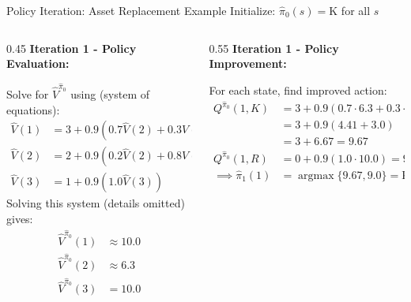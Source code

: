 \documentclass[10pt]{beamer}
\DeclareMathOperator*{\argmax}{argmax} %
\begin{document}
\begin{frame}{Policy Iteration: Asset Replacement Example}
    Initialize: $\hat{\pi}_0(s) = \text{K}$ for all $s$

    \begin{columns}[T] %
        \begin{column}{0.45\textwidth}
            \textbf{Iteration 1 - Policy Evaluation:}

            Solve for $\hat{V}^{\hat{\pi}_0}$ using (system of equations): \scriptsize %
            \begin{align*}
                \hat{V}(1) &= 3 + 0.9 (0.7 \hat{V}(2) + 0.3 \hat{V}(3)) \\
                \hat{V}(2) &= 2 + 0.9 (0.2 \hat{V}(2) + 0.8 \hat{V}(3)) \\
                \hat{V}(3) &= 1 + 0.9 (1.0 \hat{V}(3))
            \end{align*}
             Solving this system (details omitted) gives:
            \begin{align*}
                \hat{V}^{\hat{\pi}_0}(1) &\approx 10.0 \\ %
                \hat{V}^{\hat{\pi}_0}(2) &\approx 6.3 \\ %
                \hat{V}^{\hat{\pi}_0}(3) &= 10.0 %
            \end{align*}
        \end{column}

        \begin{column}{0.55\textwidth}
            \textbf{Iteration 1 - Policy Improvement:}

            For each state, find improved action: \scriptsize %
            \begin{align*}
                Q^{\hat{\pi}_0}(1,K) &= 3 + 0.9(0.7 \cdot 6.3 + 0.3 \cdot 10.0) \\
                                &= 3 + 0.9(4.41 + 3.0) \\
                                &= 3 + 6.67 = 9.67 \\
                Q^{\hat{\pi}_0}(1,R) &= 0 + 0.9(1.0 \cdot 10.0) = 9.0 \\
                \implies \hat{\pi}_1(1) &= \argmax \{9.67, 9.0\} = \text{K}
            \end{align*}


\end{column}
\end{columns}
\end{frame}
\end{document}
